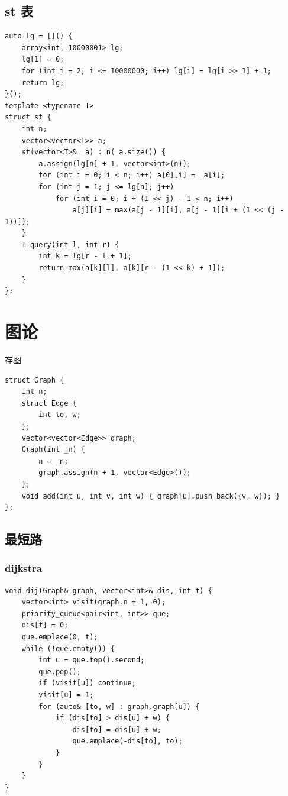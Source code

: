 \documentclass[UTF8, twoside]{ctexart}
\begin{document}
\begin{sloppypar}
\subsection{st 表}

\begin{lstlisting}[style=cpp]
auto lg = []() {
    array<int, 10000001> lg;
    lg[1] = 0;
    for (int i = 2; i <= 10000000; i++) lg[i] = lg[i >> 1] + 1;
    return lg;
}();
template <typename T>
struct st {
    int n;
    vector<vector<T>> a;
    st(vector<T>& _a) : n(_a.size()) {
        a.assign(lg[n] + 1, vector<int>(n));
        for (int i = 0; i < n; i++) a[0][i] = _a[i];
        for (int j = 1; j <= lg[n]; j++)
            for (int i = 0; i + (1 << j) - 1 < n; i++)
                a[j][i] = max(a[j - 1][i], a[j - 1][i + (1 << (j - 1))]);
    }
    T query(int l, int r) {
        int k = lg[r - l + 1];
        return max(a[k][l], a[k][r - (1 << k) + 1]);
    }
};
\end{lstlisting}

\clearpage

\section{图论}

存图

\begin{lstlisting}[style=cpp]
struct Graph {
    int n;
    struct Edge {
        int to, w;
    };
    vector<vector<Edge>> graph;
    Graph(int _n) {
        n = _n;
        graph.assign(n + 1, vector<Edge>());
    };
    void add(int u, int v, int w) { graph[u].push_back({v, w}); }
};
\end{lstlisting}

\subsection{最短路}

\subsubsection{dijkstra}

\begin{lstlisting}[style=cpp]
void dij(Graph& graph, vector<int>& dis, int t) {
    vector<int> visit(graph.n + 1, 0);
    priority_queue<pair<int, int>> que;
    dis[t] = 0;
    que.emplace(0, t);
    while (!que.empty()) {
        int u = que.top().second;
        que.pop();
        if (visit[u]) continue;
        visit[u] = 1;
        for (auto& [to, w] : graph.graph[u]) {
            if (dis[to] > dis[u] + w) {
                dis[to] = dis[u] + w;
                que.emplace(-dis[to], to);
            }
        }
    }
}
\end{lstlisting}


\end{sloppypar}
\end{document}
